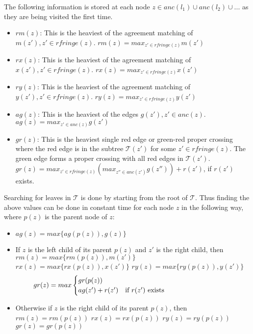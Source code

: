 The following information is stored at each node $z \in {anc(l_1) \cup anc(l_2) \cup ... }$ as they are being visited the first time.

\begin{itemize}
	\item $rm(z)$: This is the heaviest of the agreement matching of $m(z'), z' \in rfringe(z)$.
		\subitem $rm(z) = max_{z'\in rfringe(z)} m(z')$
	\item $rx(z)$: This is the heaviest of the agreement matching of $x(z'), z' \in rfringe(z)$.
		\subitem $rx(z) = max_{z'\in rfringe(z)} x(z')$
	\item $ry(z)$: This is the heaviest of the agreement matching of $y(z'), z' \in rfringe(z)$.
		\subitem $ry(z) = max_{z'\in rfringe(z)} y(z')$
	\item $ag(z)$: This is the heaviest of the edges $g(z'), z' \in anc(z)$.
		\subitem $ag(z) = max_{z'\in anc(z)} g(z')$
	\item $gr(z)$: This is the heaviest single red edge or green-red proper crossing where the red edge is in the subtree $\mathcal{T}(z')$ for some $z' \in rfringe(z)$. The green edge forms a proper crossing with all red edges in $\mathcal{T}(z')$.
		\subitem $gr(z) = max_{z'\in rfringe(z)} (max_{z''\in anc(z')} g(z'')) + r(z')$, if $r(z')$ exists.
\end{itemize}

Searching for leaves in $\mathcal{T}$ is done by starting from the root of $\mathcal{T}$. Thus finding the above values can be done in constant time for each node $z$ in the following way, where $p(z)$ is the parent node of $z$:
\begin{itemize}
	\item $ag(z) = max\{ag(p(z)), g(z)\}$
	\item If $z$ is the left child of its parent $p(z)$ and $z'$ is the right child, then
		\subitem $rm(z) = max\{rm(p(z)), m(z')\}$
		\subitem $rx(z) = max\{rx(p(z)), x(z')\}$
		\subitem $ry(z) = max\{ry(p(z)), y(z')\}$
		\begin{equation*}
		\begin{aligned} gr(z)=max
		\begin{cases}
		gr(p(z))
		\\
		ag(z') + r(z') & \text{if $r(z')$ exists}             
		\end{cases}
		\end{aligned}
		\phantom{\hspace{3.5cm}}
		\end{equation*}
	\item Otherwise if $z$ is the right child of its parent $p(z)$, then
	\subitem $rm(z) = rm(p(z))$
	\subitem $rx(z) = rx(p(z))$
	\subitem $ry(z) = ry(p(z))$
	\subitem $gr(z) = gr(p(z))$
\end{itemize}

